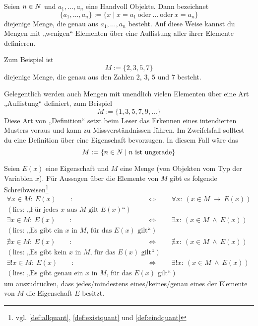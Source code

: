 \begin{nota} \label{auflistung}
    Seien $n\in \relax N$ und $a_1,\dots , a_n$ eine Handvoll Objekte. Dann bezeichnet
        \[ \{a_1,\dots , a_n\} := \{ x\mid x=a_1\ \text{oder}\ \ldots\ \text{oder}\ x=a_n \} \]
    diejenige Menge, die genau aus $a_1,\dots , a_n$ besteht. Auf diese Weise kannst du Mengen mit „wenigen“ Elementen über eine Auflistung aller ihrer Elemente definieren.
\end{nota}


\begin{bsp}
    Zum Beispiel ist
        \[ M:=\{2,3,5,7\} \]
    diejenige Menge, die genau aus den Zahlen $2$, $3$, $5$ und $7$ besteht.
\end{bsp}


\begin{bem}
    Gelegentlich werden auch Mengen mit unendlich vielen Elementen über eine Art „Auflistung“ definiert, zum Beispiel
        \[ M := \{1, 3, 5, 7, 9,\ldots \} \]
    Diese Art von „Definition“ setzt beim Leser das Erkennen eines intendierten Musters voraus und kann zu Missverständnissen führen. Im Zweifelsfall solltest du eine Definition über eine Eigenschaft bevorzugen. In diesem Fall wäre das
        \[ M := \{n \in \relax N \mid n\ \text{ist ungerade} \} \]
\end{bem}


\begin{nota} \label{beschraenktquant}
    Seien $E(x)$ eine Eigenschaft und $M$ eine Menge (von Objekten vom Typ der Variablen $x$). Für Aussagen über die Elemente von $M$ gibt es folgende Schreibweisen\footnote{vgl. \cref{def:allquant}, \cref{def:existquant} und \cref{def:eindquant}}
    \begin{align*}
        \forall x\in M:\ E(x) \qquad :& \Leftrightarrow\qquad \forall x:\ (x\in M\ \to\ E(x))  \\
        (\text{lies: „Für jedes $x$ aus $M$ gilt $E(x)$“}) & \\[0.5em]
        \exists x\in M:\ E(x) \qquad :& \Leftrightarrow\qquad \exists x:\ (x\in M\ \land\ E(x))  \\
        (\text{lies: „Es gibt ein $x$ in $M$, für das $E(x)$ gilt“}) & \\[0.5em]
        \nexists x\in M:\ E(x) \qquad :& \Leftrightarrow\qquad \nexists x:\ (x\in M\ \land\ E(x))  \\
        (\text{lies: „Es gibt kein $x$ in $M$, für das $E(x)$ gilt“}) & \\[0.5em]
        \exists ! x\in M :\ E(x) \qquad :& \Leftrightarrow\qquad \exists ! x:\ (x\in M\ \land\ E(x)) \\ (\text{lies: „Es gibt genau ein $x$ in $M$, für das $E(x)$ gilt“})
    \end{align*}
    um auszudrücken, dass jedes/mindestens eines/keines/genau eines der Elemente von $M$ die Eigenschaft $E$ besitzt.
\end{nota}



